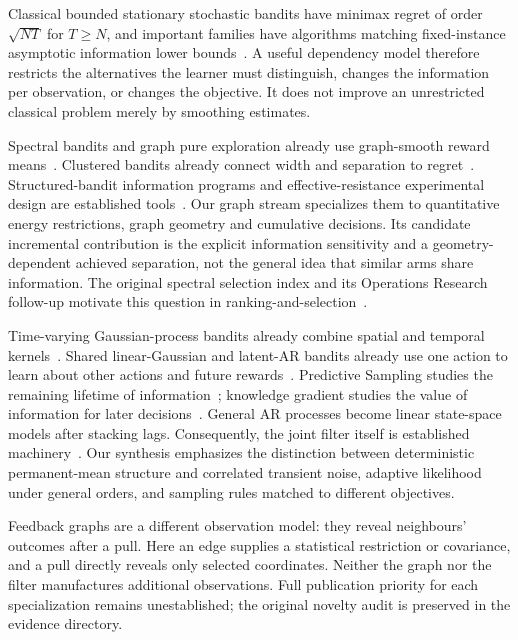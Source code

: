 Classical bounded stationary stochastic bandits have minimax regret of order $\sqrt{NT}$ for $T\ge N$, and important families have algorithms matching fixed-instance asymptotic information lower bounds~\cite{collected20,collected21,collected22}. A useful dependency model therefore restricts the alternatives the learner must distinguish, changes the information per observation, or changes the objective. It does not improve an unrestricted classical problem merely by smoothing estimates.

Spectral bandits and graph pure exploration already use graph-smooth reward means~\cite{collected1,collected17,collected2}. Clustered bandits already connect width and separation to regret~\cite{collected18,collected19}. Structured-bandit information programs and effective-resistance experimental design are established tools~\cite{collected11,collected24}. Our graph stream specializes them to quantitative energy restrictions, graph geometry and cumulative decisions. Its candidate incremental contribution is the explicit information sensitivity and a geometry-dependent achieved separation, not the general idea that similar arms share information. The original spectral selection index and its Operations Research follow-up motivate this question in ranking-and-selection~\cite{collected14,collected15,collected16}.

Time-varying Gaussian-process bandits already combine spatial and temporal kernels~\cite{collected3}. Shared linear-Gaussian and latent-AR bandits already use one action to learn about other actions and future rewards~\cite{collected4,collected5}. Predictive Sampling studies the remaining lifetime of information~\cite{collected10}; knowledge gradient studies the value of information for later decisions~\cite{collected6,collected30}. General AR processes become linear state-space models after stacking lags. Consequently, the joint filter itself is established machinery~\cite{collected33}. Our synthesis emphasizes the distinction between deterministic permanent-mean structure and correlated transient noise, adaptive likelihood under general orders, and sampling rules matched to different objectives.

Feedback graphs are a different observation model: they reveal neighbours' outcomes after a pull. Here an edge supplies a statistical restriction or covariance, and a pull directly reveals only selected coordinates. Neither the graph nor the filter manufactures additional observations. Full publication priority for each specialization remains unestablished; the original novelty audit is preserved in the evidence directory.

